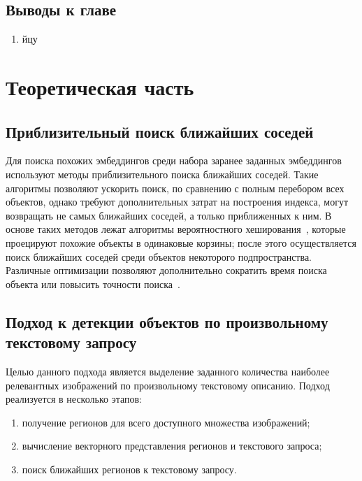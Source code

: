 \documentclass[a4paper,14pt]{article}
\begin{document}
    \subsection{Выводы к главе \thesection}
    \begin{enumerate}
        [1)]
        \itemsep0em
        \item йцу
    \end{enumerate}

    \newpage


    \section{Теоретическая часть}
    
    \subsection{Приблизительный поиск ближайших соседей}
    
    Для поиска похожих эмбеддингов среди набора заранее заданных эмбеддингов используют методы приблизительного поиска ближайших соседей.
    Такие алгоритмы позволяют ускорить поиск, по сравнению с полным перебором всех объектов, однако требуют дополнительных затрат на построения индекса, 
    могут возвращать не самых ближайших соседей, а только приближенных к ним.
    В основе таких методов лежат алгоритмы вероятностного хеширования~\cite{tao2010efficient}, которые проецируют похожие объекты в одинаковые корзины;
    после этого осуществляется поиск ближайших соседей среди объектов некоторого подпространства.
    Различные оптимизации позволяют дополнительно сократить время поиска объекта или повысить точности поиска~\cite{annoy,avq_2020}.
    
    \subsection{Подход к детекции объектов по произвольному текстовому запросу}
    
    Целью данного подхода является выделение заданного количества наиболее релевантных изображений по произвольному текстовому описанию. 
    Подход реализуется в несколько этапов:
     \begin{enumerate}
    	[1)]
    	\itemsep0em
    	\item получение регионов для всего доступного множества изображений;
    	\item вычисление векторного представления регионов и текстового запроса;
    	\item поиск ближайших регионов к текстовому запросу.
    \end{enumerate}
    
\end{document}
